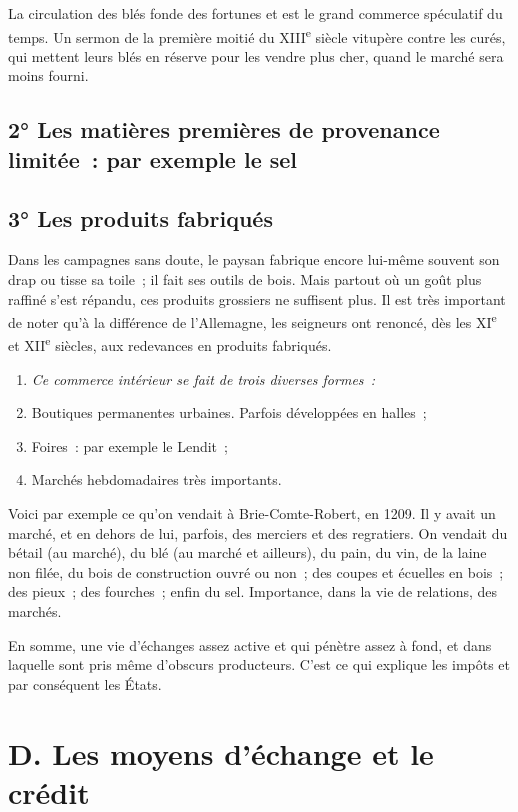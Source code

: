 \documentclass[french,twoside]{book} %
\newlength{\listmod}
\newcommand{\listhead}[1]{\hspace{-1\listmod}\emph{#1}}
\begin{document}
\noindent La circulation des blés fonde des fortunes et est le grand commerce spéculatif du temps. Un sermon de la première moitié du XIII\textsuperscript{e} siècle vitupère contre les curés, qui mettent leurs blés en réserve pour les vendre plus cher, quand le marché sera moins fourni.
\subsection[{2° Les matières premières de provenance limitée : par exemple le sel}]{2° Les matières premières de provenance limitée : par exemple le sel}
\subsection[{3° Les produits fabriqués}]{3° Les produits fabriqués}
\noindent Dans les campagnes sans doute, le paysan fabrique encore lui-même souvent son drap ou tisse sa toile ; il fait ses outils de bois. Mais partout où un goût plus raffiné s’est répandu, ces produits grossiers ne suffisent plus. Il est très important de noter qu’à la différence de l’Allemagne, les seigneurs ont renoncé, dès les XI\textsuperscript{e} et XII\textsuperscript{e} siècles, aux redevances en produits fabriqués.\par

\begin{enumerate}[itemsep=0pt,]
\item[]\listhead{Ce commerce intérieur se fait de trois diverses formes :}
\item Boutiques permanentes urbaines. Parfois développées en halles ;
\item Foires : par exemple le Lendit ;
\item Marchés hebdomadaires très importants.
\end{enumerate}

\noindent Voici par exemple ce qu’on vendait à Brie-Comte-Robert, en 1209. Il y avait un marché, et en dehors de lui, parfois, des merciers et des regratiers. On vendait du bétail (au marché), du blé (au marché et ailleurs), du pain, du vin, de la laine non filée, du bois de construction ouvré ou non ; des coupes et écuelles en bois ; des pieux ; des fourches ; enfin du sel. Importance, dans la vie de relations, des marchés.\par
\bigbreak
\noindent En somme, une vie d’échanges assez active et qui pénètre assez à fond, et dans laquelle sont pris même d’obscurs producteurs. C’est ce qui explique les impôts et par conséquent les États.
\section[{D. Les moyens d’échange et le crédit}]{D. Les moyens d’échange et le crédit}
\label{c09d}
\end{document}
